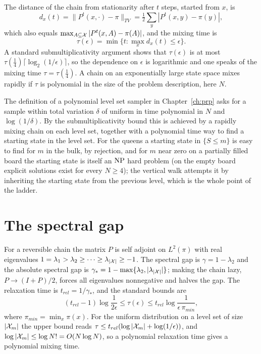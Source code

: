 The distance of the chain from stationarity after $t$ steps, started from $x$, is
\[
d_x(t) = \| P^t(x, \cdot) - \pi \|_{TV} = \tfrac12 \sum_y |P^t(x, y) - \pi(y)| ,
\]
which also equals $\max_{A \subseteq \mathcal{X}} | P^t(x, A) - \pi(A) |$, and the mixing time is
\[
\tau(\epsilon) = \min\{ t : \max_x d_x(t) \le \epsilon \} .
\]
A standard submultiplicativity argument shows that $\tau(\epsilon)$ is at most $\tau(\tfrac14) \lceil \log_2(1/\epsilon) \rceil$, so the dependence on $\epsilon$ is logarithmic and one speaks of the mixing time $\tau = \tau(\tfrac14)$. A chain on an exponentially large state space mixes rapidly if $\tau$ is polynomial in the size of the problem description, here $N$.

The definition of a polynomial level set sampler in Chapter~\ref{ch:prp} asks for a sample within total variation $\delta$ of uniform in time polynomial in $N$ and $\log(1/\delta)$. By the submultiplicativity bound this is achieved by a rapidly mixing chain on each level set, together with a polynomial time way to find a starting state in the level set. For the queens a starting state in $\{ S \le m \}$ is easy to find for $m$ in the bulk, by rejection, and for $m$ near zero on a partially filled board the starting state is itself an $\mathrm{NP}$ hard problem (on the empty board explicit solutions exist for every $N \ge 4$); the vertical walk attempts it by inheriting the starting state from the previous level, which is the whole point of the ladder.

\section{The spectral gap}

For a reversible chain the matrix $P$ is self adjoint on $L^2(\pi)$ with real eigenvalues $1 = \lambda_1 > \lambda_2 \ge \dots \ge \lambda_{|\mathcal{X}|} \ge -1$. The spectral gap is $\gamma = 1 - \lambda_2$ and the absolute spectral gap is $\gamma_* = 1 - \max\{\lambda_2, |\lambda_{|\mathcal{X}|}|\}$; making the chain lazy, $P \to (I + P)/2$, forces all eigenvalues nonnegative and halves the gap. The relaxation time is $t_{rel} = 1/\gamma_*$, and the standard bounds are
\[
(t_{rel} - 1) \log \frac{1}{2\epsilon} \le \tau(\epsilon) \le t_{rel} \log \frac{1}{\epsilon \, \pi_{min}} ,
\]
where $\pi_{min} = \min_x \pi(x)$. For the uniform distribution on a level set of size $|\mathcal{X}_m|$ the upper bound reads $\tau \le t_{rel} ( \log |\mathcal{X}_m| + \log(1/\epsilon) )$, and $\log |\mathcal{X}_m| \le \log N! = O(N \log N)$, so a polynomial relaxation time gives a polynomial mixing time.

